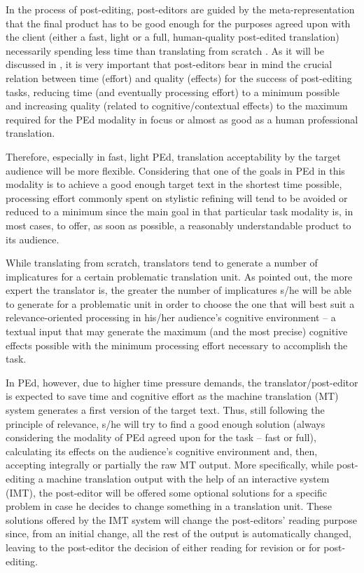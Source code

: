 \documentclass[output=paper]{langsci/langscibook}
\begin{document}
In the process of post-editing, post-editors are guided by the meta-re\-presenta\-tion that the final product has to be good enough for the purposes agreed upon with the client (either a fast, light or a full, human-quality post-edited translation) necessarily spending less time than translating from scratch \citep[cf.][]{Carl2014process, sanchis2014interactive}. As it will be discussed in , it is very important that post-editors bear in mind the crucial relation between time (effort) and quality (effects) for the success of post-editing tasks, reducing time (and eventually processing effort) to a minimum possible and increasing quality (related to cognitive/contextual effects) to the maximum required for the PEd modality in focus or almost as good as a human professional translation.



Therefore, especially in fast, light PEd, translation acceptability by the target audience will be more flexible. Considering that one of the goals in PEd in this modality is to achieve a good enough target text in the shortest time possible, processing effort commonly spent on stylistic refining will tend to be avoided or reduced to a minimum since the main goal in that particular task modality is, in most cases, to offer, as soon as possible, a reasonably understandable product to its audience. 



While translating from scratch, translators tend to generate a number of implicatures for a certain problematic translation unit. As \citet{alves2007modelling} pointed out, the more expert the translator is, the greater the number of implicatures s/he will be able to generate for a problematic unit in order to choose the one that will best suit a relevance-oriented processing in his/her audience's cognitive environment -- a textual input that may generate the maximum (and the most precise) cognitive effects possible with the minimum processing effort necessary to accomplish the task. 



In PEd, however, due to higher time pressure demands, the translator/post-editor is expected to save time and cognitive effort as the machine translation (MT) system generates a first version of the target text. Thus, still following the principle of relevance, s/he will try to find a good enough solution (always considering the modality of PEd agreed upon for the task -- fast or full), calculating its effects on the audience's cognitive environment and, then, accepting integrally or partially the raw MT output. More specifically, while post-editing a machine translation output with the help of an interactive system (IMT), the post-editor will be offered some optional solutions for a specific problem in case he decides to change something in a translation unit. These solutions offered by the IMT system will change the post-editors' reading purpose since, from an initial change, all the rest of the output is automatically changed, leaving to the post-editor the decision of either reading for revision or  for post-editing. 
\end{document}
